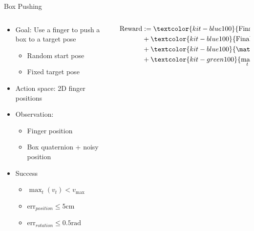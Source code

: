 \documentclass[16:9,en,navbarinfooter]{sdqbeamer}
\begin{document}
\begin{frame}{Box Pushing}

\begin{columns}[t]
    \begin{column}{0.4\textwidth}
        \vspace{1cm}
        \begin{itemize}
            \item Goal: Use a finger to push a box to a target pose
                \begin{itemize}
                    \item Random start pose
                    \item Fixed target pose
                \end{itemize}
            \item Action space: 2D finger positions
            \item Observation:
                \begin{itemize}
                    \item Finger position
                    \item Box quaternion + noisy position
                \end{itemize}
            \item Success
                \begin{itemize}
                \item $\max_t(v_t) < v_\text{max}$
                \item $\text{err}_{position} \leq 5 \text{cm}$
                \item $\text{err}_{rotation} \leq 0.5 \text{rad}$
                \end{itemize}
        \end{itemize}
            \vspace{1em}
    \end{column}
    \begin{column}{0.5\textwidth}
        \vspace{.5cm}
        \[
        \begin{aligned}
            \text{Reward} &:= \textcolor{kit-blue100}{\text{Final Euclidean Distance}} \\
             &+  \textcolor{kit-blue100}{\text{Final Rotational Distance}} \\
             &+  \textcolor{kit-blue100}{\mathds{1} \left\{\text{success}\right\} } \\
             &+  \textcolor{kit-green100}{\max_t\  \text{step}(v_t)} \\

\end{aligned}\]
\end{column}
\end{columns}
\end{frame}
\end{document}
